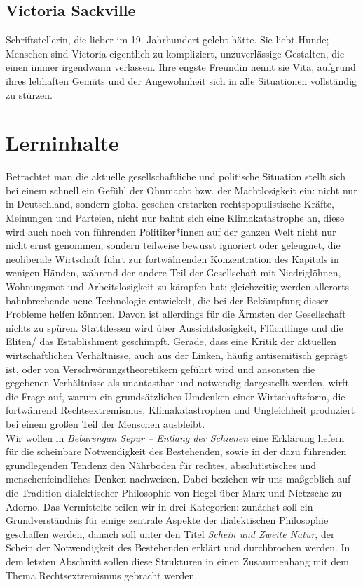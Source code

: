 \documentclass[a4paper, 12pt]{scrartcl}
\begin{document}
    \subsection{Victoria Sackville}
    Schriftstellerin, die lieber im 19. Jahrhundert gelebt hätte. Sie liebt Hunde; Menschen sind Victoria eigentlich zu kompliziert, unzuverlässige Gestalten, die einen immer irgendwann verlassen. Ihre engste Freundin nennt sie Vita, aufgrund ihres lebhaften Gemüts und der Angewohnheit sich in alle Situationen vollständig zu stürzen.

    \section{Lerninhalte}
    Betrachtet man die aktuelle gesellschaftliche und politische Situation stellt sich bei einem  schnell ein Gefühl der  Ohnmacht bzw. der Machtlosigkeit ein: nicht nur in Deutschland, sondern global gesehen erstarken rechtspopulistische Kräfte, Meinungen und Parteien, nicht nur bahnt sich eine Klimakatastrophe an, diese wird auch noch von führenden Politiker*innen auf der ganzen Welt nicht nur nicht ernst genommen, sondern teilweise bewusst ignoriert oder geleugnet, die neoliberale Wirtschaft führt zur fortwährenden Konzentration des Kapitals in wenigen Händen, während der andere Teil der Gesellschaft mit Niedriglöhnen, Wohnungsnot und Arbeitslosigkeit zu kämpfen hat; gleichzeitig werden allerorts bahnbrechende neue Technologie entwickelt, die bei der Bekämpfung dieser Probleme helfen könnten. 
    Davon ist allerdings für die Ärmsten der Gesellschaft nichts zu spüren. Stattdessen wird über Aussichtslosigkeit, Flüchtlinge und die Eliten/ das Establishment geschimpft. Gerade, dass eine Kritik der aktuellen wirtschaftlichen Verhältnisse, auch aus der Linken, häufig antisemitisch geprägt ist, oder von Verschwörungstheoretikern geführt wird und ansonsten die gegebenen Verhältnisse als unantastbar und notwendig dargestellt werden, wirft die Frage auf, warum ein grundsätzliches Umdenken einer Wirtschaftsform, die fortwährend Rechtsextremismus, Klimakatastrophen und Ungleichheit produziert bei einem großen Teil der Menschen ausbleibt. \\
    Wir wollen in \textit{Bebarengan Sepur – Entlang der Schienen} eine Erklärung liefern für die scheinbare Notwendigkeit des Bestehenden, sowie in der dazu führenden grundlegenden Tendenz den Nährboden für rechtes, absolutistisches und menschenfeindliches Denken nachweisen. 
    Dabei beziehen wir uns maßgeblich auf die Tradition dialektischer Philosophie von Hegel über Marx und Nietzsche zu Adorno. 
    Das Vermittelte teilen wir in drei Kategorien: zunächst soll ein Grundverständnis für einige zentrale Aspekte der dialektischen Philosophie geschaffen werden, danach soll unter den Titel \textit{Schein und Zweite Natur}, der Schein der Notwendigkeit des Bestehenden erklärt und durchbrochen werden. 
    In dem letzten Abschnitt sollen diese Strukturen in einen Zusammenhang mit dem Thema Rechtsextremismus gebracht werden.
\end{document}
